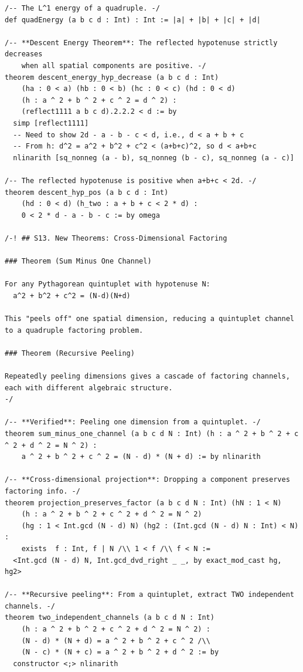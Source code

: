 \documentclass[11pt,openright,twoside]{book}
\theoremstyle{definition}
\begin{document}
\begin{lstlisting}[style=lean]
/-- The L^1 energy of a quadruple. -/
def quadEnergy (a b c d : Int) : Int := |a| + |b| + |c| + |d|

/-- **Descent Energy Theorem**: The reflected hypotenuse strictly decreases
    when all spatial components are positive. -/
theorem descent_energy_hyp_decrease (a b c d : Int)
    (ha : 0 < a) (hb : 0 < b) (hc : 0 < c) (hd : 0 < d)
    (h : a ^ 2 + b ^ 2 + c ^ 2 = d ^ 2) :
    (reflect1111 a b c d).2.2.2 < d := by
  simp [reflect1111]
  -- Need to show 2d - a - b - c < d, i.e., d < a + b + c
  -- From h: d^2 = a^2 + b^2 + c^2 < (a+b+c)^2, so d < a+b+c
  nlinarith [sq_nonneg (a - b), sq_nonneg (b - c), sq_nonneg (a - c)]

/-- The reflected hypotenuse is positive when a+b+c < 2d. -/
theorem descent_hyp_pos (a b c d : Int)
    (hd : 0 < d) (h_two : a + b + c < 2 * d) :
    0 < 2 * d - a - b - c := by omega

/-! ## S13. New Theorems: Cross-Dimensional Factoring

### Theorem (Sum Minus One Channel)

For any Pythagorean quintuplet with hypotenuse N:
  a^2 + b^2 + c^2 = (N-d)(N+d)

This "peels off" one spatial dimension, reducing a quintuplet channel
to a quadruple factoring problem.

### Theorem (Recursive Peeling)

Repeatedly peeling dimensions gives a cascade of factoring channels,
each with different algebraic structure.
-/

/-- **Verified**: Peeling one dimension from a quintuplet. -/
theorem sum_minus_one_channel (a b c d N : Int) (h : a ^ 2 + b ^ 2 + c ^ 2 + d ^ 2 = N ^ 2) :
    a ^ 2 + b ^ 2 + c ^ 2 = (N - d) * (N + d) := by nlinarith

/-- **Cross-dimensional projection**: Dropping a component preserves factoring info. -/
theorem projection_preserves_factor (a b c d N : Int) (hN : 1 < N)
    (h : a ^ 2 + b ^ 2 + c ^ 2 + d ^ 2 = N ^ 2)
    (hg : 1 < Int.gcd (N - d) N) (hg2 : (Int.gcd (N - d) N : Int) < N) :
    exists  f : Int, f | N /\\ 1 < f /\\ f < N :=
  <Int.gcd (N - d) N, Int.gcd_dvd_right _ _, by exact_mod_cast hg, hg2>

/-- **Recursive peeling**: From a quintuplet, extract TWO independent channels. -/
theorem two_independent_channels (a b c d N : Int)
    (h : a ^ 2 + b ^ 2 + c ^ 2 + d ^ 2 = N ^ 2) :
    (N - d) * (N + d) = a ^ 2 + b ^ 2 + c ^ 2 /\\
    (N - c) * (N + c) = a ^ 2 + b ^ 2 + d ^ 2 := by
  constructor <;> nlinarith


\end{lstlisting}
\end{document}
